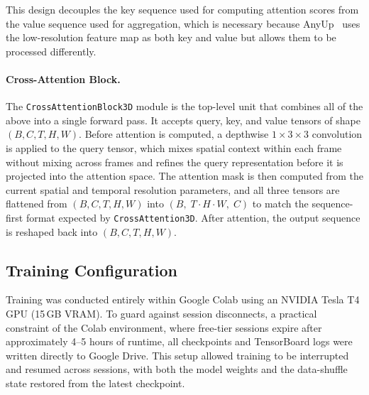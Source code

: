 \noindent This design decouples the key sequence used for computing attention scores from the value sequence used for aggregation, which is necessary because AnyUp~\cite{anyup} uses the low-resolution feature map as both key and value but allows them to be processed differently.

\paragraph{Cross-Attention Block.}
The \texttt{CrossAttentionBlock3D} module is the top-level unit that combines all of the above into a single forward pass. It accepts query, key, and value tensors of shape $(B, C, T, H, W)$. Before attention is computed, a depthwise $1 \times 3 \times 3$ convolution is applied to the query tensor, which mixes spatial context within each frame without mixing across frames and refines the query representation before it is projected into the attention space. The attention mask is then computed from the current spatial and temporal resolution parameters, and all three tensors are flattened from $(B, C, T, H, W)$ into $(B,\; T \cdot H \cdot W,\; C)$ to match the sequence-first format expected by \texttt{CrossAttention3D}. After attention, the output sequence is reshaped back into $(B, C, T, H, W)$.

\subsection{Training Configuration}
\label{sec:training}

Training was conducted entirely within Google Colab using an NVIDIA Tesla T4 GPU (15\,GB VRAM). To guard against session disconnects, a practical constraint of the Colab environment, where free-tier sessions expire after approximately 4--5 hours of runtime, all checkpoints and TensorBoard logs were written directly to Google Drive. This setup allowed training to be interrupted and resumed across sessions, with both the model weights and the data-shuffle state restored from the latest checkpoint.

